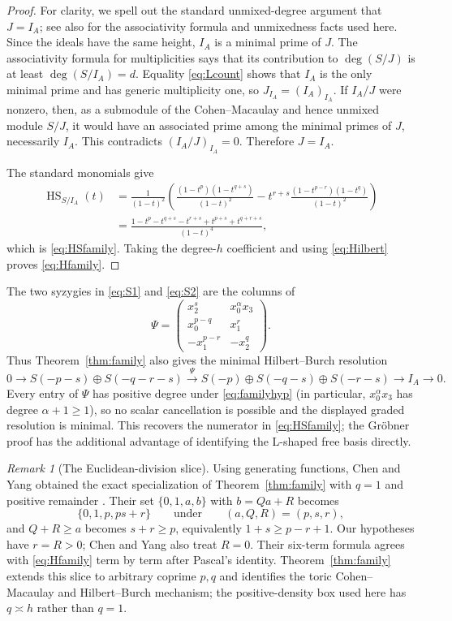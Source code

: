 \documentclass[11pt,reqno]{amsart}
\theoremstyle{definition}
\theoremstyle{remark}
\newtheorem{remark}[theorem]{Remark}
\newcommand{\HS}{\operatorname{HS}}
\begin{document}
\begin{proof}
For clarity, we spell out the standard unmixed-degree argument that
$J=I_A$; see also \cite{BrunsHerzog1993} for the associativity formula and
unmixedness facts used here.  Since the ideals have the same height, $I_A$
is a minimal prime
of $J$.  The associativity formula for multiplicities says that its
contribution to $\deg(S/J)$ is at least $\deg(S/I_A)=d$.  Equality
\eqref{eq:Lcount} shows that $I_A$ is the only minimal prime and has
generic multiplicity one, so $J_{I_A}=(I_A)_{I_A}$.  If $I_A/J$ were
nonzero, then, as a submodule of the Cohen--Macaulay and hence unmixed
module $S/J$, it would have an associated prime among the minimal primes
of $J$, necessarily $I_A$.  This contradicts $(I_A/J)_{I_A}=0$.
Therefore $J=I_A$.

The standard monomials give
\begin{align*}
 \HS_{S/I_A}(t)
 &=\frac1{(1-t)^2}
 \left(
 \frac{(1-t^p)(1-t^{q+s})}{(1-t)^2}
 -t^{r+s}\frac{(1-t^{p-r})(1-t^q)}{(1-t)^2}
 \right)\\
 &=\frac{1-t^p-t^{q+s}-t^{r+s}+t^{p+s}+t^{q+r+s}}
 {(1-t)^4},
\end{align*}
which is \eqref{eq:HSfamily}.  Taking the degree-$h$ coefficient and using
\eqref{eq:Hilbert} proves \eqref{eq:Hfamily}.
\end{proof}

The two syzygies in \eqref{eq:S1} and \eqref{eq:S2} are the columns of
\[
 \Psi=
 \begin{pmatrix}
  x_2^s & x_0^\alpha x_3\\
  x_0^{p-q} & x_1^r\\
  -x_1^{p-r} & -x_2^q
 \end{pmatrix}.
\]
Thus Theorem~\ref{thm:family} also gives the minimal Hilbert--Burch
resolution
{\small
\[
 0\longrightarrow S(-p-s)\oplus S(-q-r-s)
 \xrightarrow{\ \Psi\ }
 S(-p)\oplus S(-q-s)\oplus S(-r-s)
 \longrightarrow I_A\longrightarrow0.
\]
}
Every entry of $\Psi$ has positive degree under \eqref{eq:familyhyp}
(in particular, $x_0^\alpha x_3$ has degree $\alpha+1\geq1$), so no scalar
cancellation is possible and the displayed graded resolution is minimal.
This recovers the numerator in \eqref{eq:HSfamily}; the Gr\"obner proof has
the additional advantage of identifying the L-shaped free basis directly.

\begin{remark}[The Euclidean-division slice]
Using generating functions, Chen and Yang obtained the exact specialization
of Theorem~\ref{thm:family} with $q=1$ and positive remainder
\cite[Corollary~1]{ChenYang2026}.  Their set $\{0,1,a,b\}$ with
$b=Qa+R$ becomes
\[
 \{0,1,p,ps+r\}
 \qquad\text{under}\qquad (a,Q,R)=(p,s,r),
\]
and $Q+R\geq a$ becomes $s+r\geq p$, equivalently
$1+s\geq p-r+1$.  Our hypotheses have $r=R>0$; Chen and Yang also treat
$R=0$.  Their six-term formula agrees with \eqref{eq:Hfamily} term by term
after Pascal's identity.  Theorem~\ref{thm:family} extends this slice to
arbitrary coprime $p,q$ and identifies the toric Cohen--Macaulay and
Hilbert--Burch mechanism; the positive-density box used here has
$q\asymp h$ rather than $q=1$.
\end{remark}
\end{document}
